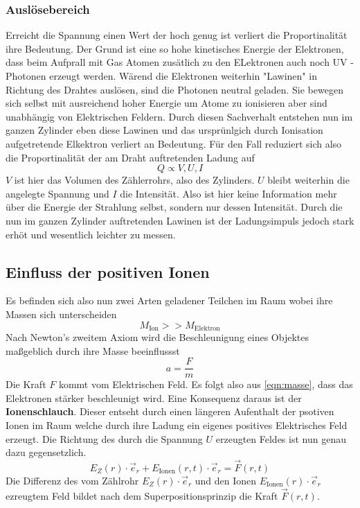 \subsubsection{Auslösebereich}
Erreicht die Spannung einen Wert der hoch genug ist verliert die Proportinalität ihre Bedeutung. 
Der Grund ist eine so hohe kinetisches Energie der Elektronen, dass beim Aufprall mit Gas Atomen zusätlich zu den ELektronen auch noch UV - Photonen erzeugt werden. 
Wärend die Elektronen weiterhin "Lawinen" %
in Richtung des Drahtes auslösen, sind die Photonen neutral geladen. Sie bewegen sich selbst mit ausreichend hoher Energie um Atome zu ionisieren aber sind unabhängig von 
Elektrischen Feldern. Durch diesen Sachverhalt entstehen nun im ganzen Zylinder eben diese Lawinen und das ursprünlgich durch Ionisation aufgetretende Elkektron verliert an Bedeutung.
Für den Fall reduziert sich also die Proportinalität der am Draht auftretenden Ladung auf
\begin{equation*}
\label{eqn:prop3}
Q \propto V, U, I
\end{equation*}
$V$ ist hier das Volumen des Zählerrohrs, also des Zylinders. $U$ bleibt weiterhin die angelegte Spannung und $I$ die Intensität.
Also ist hier keine Information mehr über die Energie der Strahlung selbst, sondern nur dessen Intensität.
Durch die nun im ganzen Zylinder auftretenden Lawinen ist der Ladungsimpuls jedoch stark erhöt und wesentlich leichter zu messen.

\subsection{Einfluss der positiven Ionen}
Es befinden sich also nun zwei Arten geladener Teilchen im Raum wobei ihre Massen sich unterscheiden
\begin{equation*}
\label{eqn:masse}
M_\text{Ion} >> M_\text{Elektron}
\end{equation*}
Nach Newton's zweitem Axiom wird die Beschleunigung eines Objektes maßgeblich durch ihre Masse beeinflussst
\begin{equation*}
\label{eqn:masse}
a= \frac{F}{m}
\end{equation*}
Die Kraft $F$ kommt vom Elektrischen Feld. Es folgt also aus \eqref{eqn:masse}, dass das Elektronen stärker beschleunigt wird. Eine Konsequenz daraus ist der \textbf{Ionenschlauch}. Dieser entseht 
durch einen längeren Aufenthalt der psotiven Ionen im Raum welche durch ihre Ladung ein eigenes positives Elektrisches Feld erzeugt. Die Richtung des durch die Spannung $U$ erzeugten Feldes ist nun genau dazu gegensetzlich.
\begin{equation*}
\label{eqn:Felder}
E_Z(r)\cdot \vec{e}_r + E_\text{Ionen}(r,t) \cdot \vec{e}_r = \vec{F}(r,t)
\end{equation*}
Die Differenz des vom Zählrohr $E_Z(r)\cdot \vec{e}_r$ und den Ionen $E_\text{Ionen}(r) \cdot \vec{e}_r$ ezreugtem Feld bildet nach dem Superpositionsprinzip  die Kraft $\vec{F}(r,t)$.
